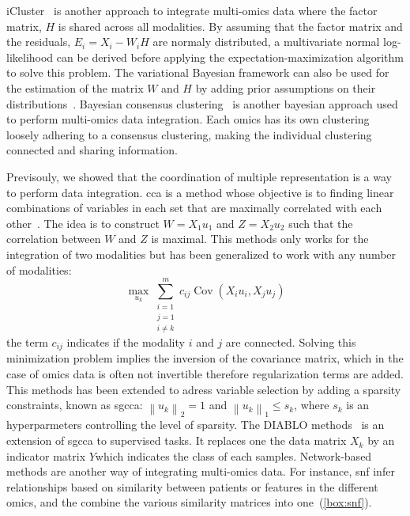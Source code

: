 \documentclass[../main.tex]{subfiles}
\begin{document}
	iCluster~\cite{Shen2009} is another approach to integrate multi-omics data where the factor matrix, \(H\) is shared across all modalities.
	By assuming that the factor matrix and the residuals, \(E_i = X_i - W_i H\) are normaly distributed, a multivariate normal log-likelihood can be derived before applying the expectation-maximization algorithm to solve this problem.
	The variational Bayesian framework can also be used for the estimation of the matrix \(W\) and \(H\) by adding prior assumptions on their distributions~\cite{MOFA}.
	Bayesian consensus clustering~\cite{Lock2013_BCC} is another bayesian approach used to perform multi-omics data integration.
	Each omics has its own clustering loosely adhering to a consensus clustering, making the individual clustering connected and sharing information.

	Previsouly, we showed that the coordination of multiple representation is a way to perform data integration.
	\Gls{cca} is a method whose objective is to finding linear combinations of variables in each set that are maximally correlated with each other~\cite{Hardle2007}.
	The idea is to construct \(W=X_1u_1\) and \(Z=X_2u_2\) such that the correlation between \(W\) and \(Z\) is maximal.
	This methods only works for the integration of two modalities but has been generalized to work with any number of modalities:
	\begin{equation}
		\max_{u_k} \sum_{\substack{i=1 \\ j=1 \\ i\neq k}}^{m} c_{ij}\operatorname{Cov}\left(X_i u_i,X_j u_j\right)
	\end{equation}
	the term \(c_{ij}\) indicates if the modality \(i\) and \(j\) are connected.
	Solving this minimization problem implies the inversion of the covariance matrix, which in the case of omics data is often not invertible therefore regularization terms are added.
	This methods has been extended to adress variable selection by adding a sparsity constraints, known as \gls{sgcca}: \({\left\|u_k \right\|}_2 = 1\) and \({\left\|u_k \right\|}_1 \leq s_k\), where \(s_k\) is an hyperparmeters controlling the level of sparsity.
	The DIABLO methods~\cite{DIABLO} is an extension of \gls{sgcca} to supervised tasks.
	It replaces one the data matrix \(X_k\) by an indicator matrix \(Y\)which indicates the class of each samples.
	Network-based methods are another way of integrating multi-omics data.
	For instance, \gls{snf} infer relationships based on similarity between patients or features in the different omics, and the combine the various similarity matrices into one~(\cref{box:snf}).
\end{document}
